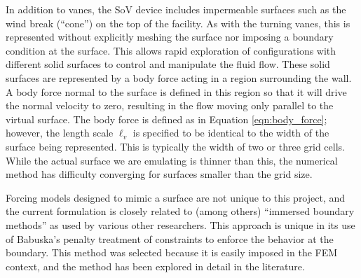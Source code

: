 In addition to vanes, the SoV device includes impermeable surfaces
such as the wind break (``cone'') on the top of the facility. As with
the turning vanes, this is represented without explicitly meshing the
surface nor imposing  a boundary condition at the surface. This allows
rapid exploration of configurations  with different solid surfaces to
control and manipulate the fluid flow. These solid surfaces are
represented by a body force acting in a region surrounding the wall. 
A body force normal to the surface is defined in this region so
that it will drive the normal velocity to zero, resulting in the flow
moving only parallel to the virtual surface. 
The body force is defined as in Equation
\ref{eqn:body_force}; however, the length scale $\ell_v$ is specified to
be identical to the width of the surface being represented. This is
typically the width of two or three grid cells. While the actual surface we are
emulating is thinner than this, the numerical method has difficulty
converging for surfaces smaller than the grid size.  

Forcing models designed to mimic a surface
are not unique to this project, and the current formulation is
 closely related to (among others)
``immersed boundary methods'' as used by various other
researchers\cite{doi:10.1146/annurev.fluid.37.061903.175743}. 
This approach is unique in its use of Babuska's penalty treatment of
constraints\cite{1973fempen,ZAMM:ZAMM19880680925} to enforce the
behavior at the boundary. This method was selected because it is easily
imposed in the FEM context, and the method has been explored in detail
in the literature. 


